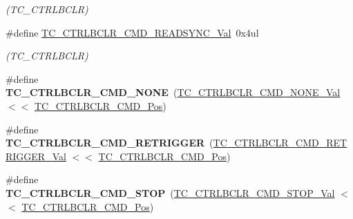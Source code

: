\begin{DoxyCompactItemize}
\begin{DoxyCompactList}\small\item\em (T\+C\+\_\+\+C\+T\+R\+L\+B\+C\+L\+R) \end{DoxyCompactList}\item 
\hypertarget{group___s_a_m_l21___t_c_gac21e1409aca7821d2dbe2d030d874006}{}\#define \hyperlink{group___s_a_m_l21___t_c_gac21e1409aca7821d2dbe2d030d874006}{T\+C\+\_\+\+C\+T\+R\+L\+B\+C\+L\+R\+\_\+\+C\+M\+D\+\_\+\+R\+E\+A\+D\+S\+Y\+N\+C\+\_\+\+Val}~0x4ul\label{group___s_a_m_l21___t_c_gac21e1409aca7821d2dbe2d030d874006}

\begin{DoxyCompactList}\small\item\em (T\+C\+\_\+\+C\+T\+R\+L\+B\+C\+L\+R) \end{DoxyCompactList}\item 
\hypertarget{group___s_a_m_l21___t_c_ga3e4d1fb25b06b8f9e8176efeb0f172f5}{}\#define {\bfseries T\+C\+\_\+\+C\+T\+R\+L\+B\+C\+L\+R\+\_\+\+C\+M\+D\+\_\+\+N\+O\+N\+E}~(\hyperlink{group___s_a_m_l21___t_c_ga13574095985ab7e7e6565d52278521ce}{T\+C\+\_\+\+C\+T\+R\+L\+B\+C\+L\+R\+\_\+\+C\+M\+D\+\_\+\+N\+O\+N\+E\+\_\+\+Val}      $<$$<$ \hyperlink{group___s_a_m_l21___t_c_gab48aaea729baf61fabeb52131fb7aac2}{T\+C\+\_\+\+C\+T\+R\+L\+B\+C\+L\+R\+\_\+\+C\+M\+D\+\_\+\+Pos})\label{group___s_a_m_l21___t_c_ga3e4d1fb25b06b8f9e8176efeb0f172f5}

\item 
\hypertarget{group___s_a_m_l21___t_c_gaa1bb3ba6941667023ad14a2bce747e69}{}\#define {\bfseries T\+C\+\_\+\+C\+T\+R\+L\+B\+C\+L\+R\+\_\+\+C\+M\+D\+\_\+\+R\+E\+T\+R\+I\+G\+G\+E\+R}~(\hyperlink{group___s_a_m_l21___t_c_ga5001acd1fad5be8f189902a3f7829d59}{T\+C\+\_\+\+C\+T\+R\+L\+B\+C\+L\+R\+\_\+\+C\+M\+D\+\_\+\+R\+E\+T\+R\+I\+G\+G\+E\+R\+\_\+\+Val} $<$$<$ \hyperlink{group___s_a_m_l21___t_c_gab48aaea729baf61fabeb52131fb7aac2}{T\+C\+\_\+\+C\+T\+R\+L\+B\+C\+L\+R\+\_\+\+C\+M\+D\+\_\+\+Pos})\label{group___s_a_m_l21___t_c_gaa1bb3ba6941667023ad14a2bce747e69}

\item 
\hypertarget{group___s_a_m_l21___t_c_gadd813fd076e11dfaa640dadc5d1cb235}{}\#define {\bfseries T\+C\+\_\+\+C\+T\+R\+L\+B\+C\+L\+R\+\_\+\+C\+M\+D\+\_\+\+S\+T\+O\+P}~(\hyperlink{group___s_a_m_l21___t_c_ga292d724ca99517e1c24fb52c4757b0cb}{T\+C\+\_\+\+C\+T\+R\+L\+B\+C\+L\+R\+\_\+\+C\+M\+D\+\_\+\+S\+T\+O\+P\+\_\+\+Val}      $<$$<$ \hyperlink{group___s_a_m_l21___t_c_gab48aaea729baf61fabeb52131fb7aac2}{T\+C\+\_\+\+C\+T\+R\+L\+B\+C\+L\+R\+\_\+\+C\+M\+D\+\_\+\+Pos})\label{group___s_a_m_l21___t_c_gadd813fd076e11dfaa640dadc5d1cb235}


\end{DoxyCompactItemize}
